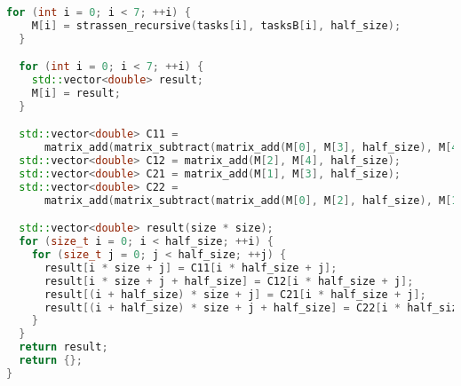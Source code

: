 \documentclass[a4paper,12pt]{article}
\begin{document}
\begin{lstlisting}[language=C++]
  for (int i = 0; i < 7; ++i) {
    M[i] = strassen_recursive(tasks[i], tasksB[i], half_size);
  }

  for (int i = 0; i < 7; ++i) {
    std::vector<double> result;
    M[i] = result;
  }

  std::vector<double> C11 =
      matrix_add(matrix_subtract(matrix_add(M[0], M[3], half_size), M[4], half_size), M[6], half_size);
  std::vector<double> C12 = matrix_add(M[2], M[4], half_size);
  std::vector<double> C21 = matrix_add(M[1], M[3], half_size);
  std::vector<double> C22 =
      matrix_add(matrix_subtract(matrix_add(M[0], M[2], half_size), M[1], half_size), M[5], half_size);

  std::vector<double> result(size * size);
  for (size_t i = 0; i < half_size; ++i) {
    for (size_t j = 0; j < half_size; ++j) {
      result[i * size + j] = C11[i * half_size + j];
      result[i * size + j + half_size] = C12[i * half_size + j];
      result[(i + half_size) * size + j] = C21[i * half_size + j];
      result[(i + half_size) * size + j + half_size] = C22[i * half_size + j];
    }
  }
  return result;
  return {};
}
\end{lstlisting}
\end{document}
